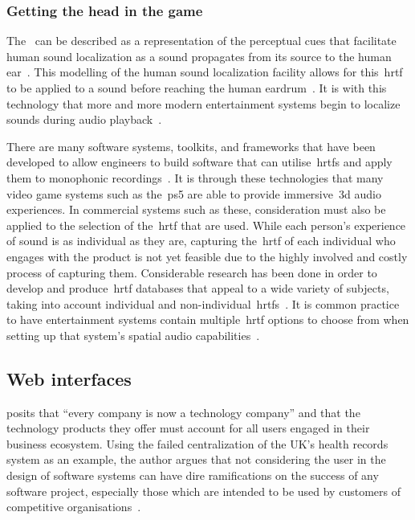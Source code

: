 \subsubsection{Getting the head in the game}

The~ can be described as a representation of the perceptual cues that facilitate human sound localization as a sound propagates from its source to the human ear~\citep{Suzuki2011}.
This modelling of the human sound localization facility allows for this~\gls{hrtf} to be applied to a sound before reaching the human eardrum~\citep{roginska2017immersive}.
It is with this technology that more and more modern entertainment systems begin to localize sounds during audio playback~\citep{blauert_spatial, HONDA2007, roginska2017immersive, Suzuki2011, Xie2013, ps5_audio, soundscape_design}.

There are many software systems, toolkits, and frameworks that have been developed to allow engineers to build software that can utilise~\glspl{hrtf} and apply them to monophonic recordings~\citep{3d_tune_in, resonance}.
It is through these technologies that many video game systems such as the~\gls{ps5} are able to provide immersive~\gls{3d} audio experiences.
In commercial systems such as these, consideration must also be applied to the selection of the~\gls{hrtf} that are used.
While each person's experience of sound is as individual as they are, capturing the~\gls{hrtf} of each individual who engages with the product is not yet feasible due to the highly involved and costly process of capturing them.
Considerable research has been done in order to develop and produce~\gls{hrtf} databases that appeal to a wide variety of subjects, taking into account individual and non-individual~\glspl{hrtf}~\citep{armstrong_}.
It is common practice to have entertainment systems contain multiple~\gls{hrtf} options to choose from when setting up that system's spatial audio capabilities~\citep{shukla2018user}.

\subsection{Web interfaces}\label{subsec:web-interfaces}
\citet{kantamneni2022user} posits
that ``every company is now a technology company''
and that the technology products they offer must account for all users engaged in their business ecosystem.
Using the failed centralization of the UK's health records system as an example, the author argues
that not considering the user in the design of software systems can have dire ramifications on the success of any software project,
especially those which are intended to be used by customers of competitive organisations~\citet{kantamneni2022user}.

